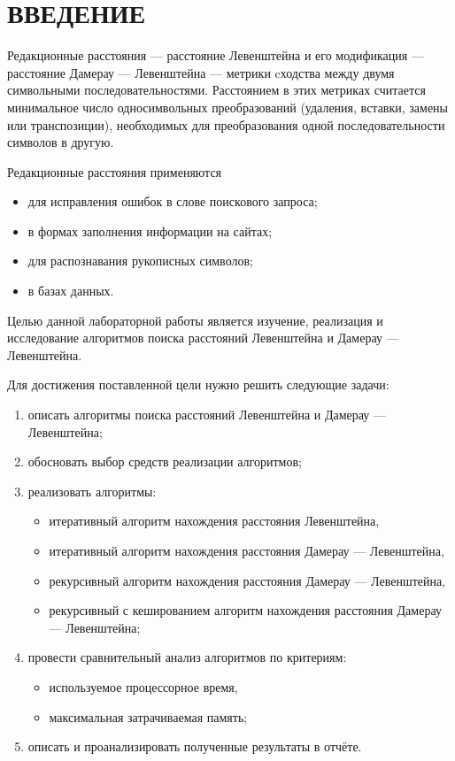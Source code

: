 \section*{ВВЕДЕНИЕ}

Редакционные расстояния --- расстояние Левенштейна и его модификация --- расстояние Дамерау --- Левенштейна --- метрики cходства между двумя символьными последовательностями.
Расстоянием в этих метриках считается минимальное число односимвольных преобразований (удаления, вставки, замены или транспозиции), необходимых для преобразования одной последовательности символов в другую.

Редакционные расстояния применяются 
\begin{itemize}
    \item для исправления ошибок в слове поискового запроса;
    \item в формах заполнения информации на сайтах;
    \item для распознавания рукописных символов;
    \item в базах данных. \cite{ldla}
\end{itemize}

Целью данной лабораторной работы является изучение, реализация и исследование алгоритмов поиска расстояний Левенштейна и Дамерау --- Левенштейна.

Для достижения поставленной цели нужно решить следующие задачи:
\begin{enumerate}
    \item описать алгоритмы поиска расстояний Левенштейна и Дамерау --- Левенштейна;
    \item обосновать выбор средств реализации алгоритмов;
    \item реализовать алгоритмы:
        \begin{itemize}[leftmargin=*]
            \item итеративный алгоритм нахождения расстояния Левенштейна,
            \item итеративный алгоритм нахождения расстояния Дамерау --- Левенштейна,
            \item рекурсивный алгоритм нахождения расстояния Дамерау --- Левенштейна,
            \item рекурсивный с кешированием алгоритм нахождения расстояния Дамерау --- Левенштейна;
        \end{itemize}
    \item провести сравнительный анализ алгоритмов по критериям:
        \begin{itemize}[leftmargin=*]
            \item используемое процессорное время,
            \item максимальная затрачиваемая память;
        \end{itemize}
    \item описать и проанализировать полученные результаты в отчёте.
\end{enumerate} %
